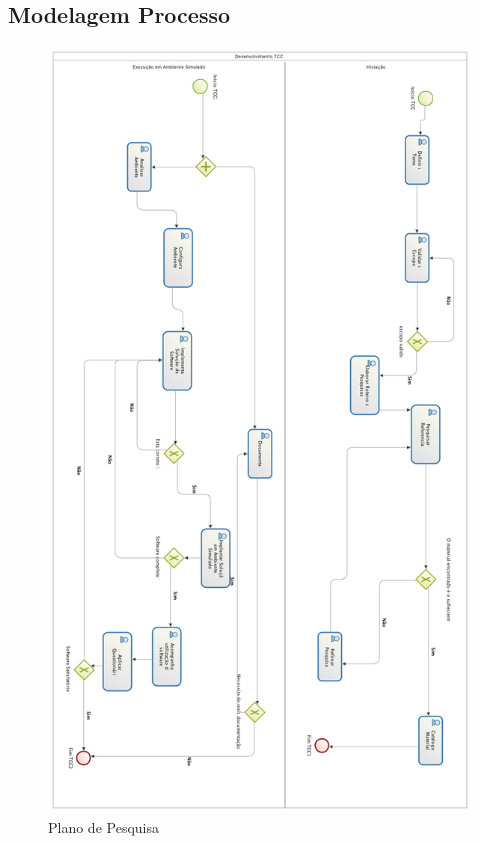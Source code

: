 \begin{apendicesenv}
\chapter{Modelagem Processo}
\graphicspath{{figuras/}}
\begin{figure}
\centering
\includegraphics[scale=0.80]{TCCMetodologia.png}
\caption{Plano de Pesquisa}
\label{Rotulo}
\end{figure}



\end{apendicesenv}
